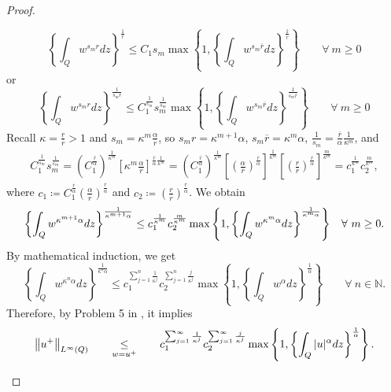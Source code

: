 \documentclass[11pt, a4paper]{article}
\numberwithin{equation}{section}
\newcommand{\coex}[2][\hphantom{longexplanation}]{%
  \underset{{#1}}{\overset{\hphantom{longexplanation}}{#2}}
}
\newcommand{\hk}{\hspace*{.12in}}
\newcommand{\NN}{{\mathbb N}}
\newcommand{\norm}[1]{\left\lVert #1\right\rVert}
\begin{document}
\begin{proof}
\begin{description}[wide]
 \[\left\{\int_{Q} w^{s_{m}r}  dz\right\}^{\frac{1}{r}}\le  
 C_{1}s_{m}\max\left\{1,\left\{\int_{Q}w^{s_{m}\overline{r}}  dz\right\}^{\frac{1}{\overline{r}}}\right\}  \qquad\forall~m\ge 0
\]
or
\[\left\{\int_{Q} w^{s_{m}r} dz\right\}^{\frac{1}{s_{m}r}}\le
 C_{1}^{\frac{1}{s_{m}}}s_{m}^{\frac{1}{s_{m}}}\max\left\{1,\left\{\int_{Q}w^{s_{m}\overline{r}}  dz\right\}^{\frac{1}{s_{m}\overline{r}}}\right\}  \qquad\forall~m\ge 0
 \]
Recall $\kappa=\frac{r}{\overline{r}}>1$ and $s_{m}=
\kappa^{m}\frac{\alpha}{\overline{r}}$, so $s_{m}r=
\kappa^{m+1}\alpha$, $s_{m}\overline{r}= \kappa^{m}\alpha$,
$\frac{1}{s_{m}}=\frac{\overline{r}}{\alpha}\frac{1}{\kappa^{m}} $, and %
\begin{align*}
C_{1}^{\frac{1}{s_{m}}} s_{m}^{\frac{1}{s_{m}}}= \left(
  C_{1}^{\frac{\overline{r}}{\alpha}} \right)^{\frac{1}{\kappa^{m}}} \left[ \kappa^{m}\frac{\alpha}{\overline{r}}
\right]^{\frac{\overline{r}}{\alpha}\frac{1}{\kappa^{m}}}
= \left( C_{1}^{\frac{\overline{r}}{\alpha}}
  \right)^{\frac{1}{\kappa^{m}}} \left[\left(\frac{\alpha}{\overline{r}}
  \right)^{\frac{\overline{r}}{\alpha}} \right]^{\frac{1}{\kappa^{m}}}
\left[ \left(\frac{r}{\overline{r}}
  \right)^{\frac{\overline{r}}{\alpha}}
  \right]^{\frac{m}{\kappa^{m}}}
  = c_{1}^{\frac{1}{\kappa^{m}}}c_{2}^{\frac{m}{\kappa^{m}}},
\end{align*}
where $c_{1}\coloneqq
C_{1}^{\frac{\overline{r}}{\alpha}} \left(\frac{\alpha}{\overline{r}} \right)^{\frac{\overline{r}}{\alpha}}$
and $c_{2}\coloneqq\left(\frac{r}{\overline{r}} \right)^{\frac{\overline{r}}{\alpha}}$.
We obtain
\begin{equation}
  \left\{\int_{Q}  w^{\kappa^{m+1}\alpha} dz\right\}^{\frac{1}{\kappa^{m+1}\alpha} }  \le  
  c_{1}^{\frac{1}{\kappa^{m}}}c_{2}^{\frac{m}{\kappa^{m}}}\max\left\{1,\left\{\int_{Q} w^{\kappa^{m}\alpha}  dz\right\}^{\frac{1}{\kappa^{m}\alpha}}\right\}\hk\forall~m\ge 0.
 \label{le465b}
\end{equation}
 By mathematical induction, we get
 \[
   \left\{\int_{Q}w^{\kappa^{n}\alpha}dz\right\}^{\frac{1}{\kappa^{n}\alpha}}
   \le
c_{1}^{\sum_{j=1}^{n}\frac{1}{\kappa^{j}}}c_{2}^{\sum_{j=1}^{n}\frac{j}{\kappa^{j}}}\max\left\{1,\left\{\int_{Q}w^{\alpha}
     dz\right\}^{\frac{1}{\alpha}}\right\}\qquad\forall~n\in\NN.
\]
    Therefore,  by Problem 5 in \cite[p.71]{rudinRealComplexAnalysis1987}, it implies 
    \[
      \norm{u^{+}}_{L^{\infty}(Q)}
      \coex[w = u^+]{\le}      c_{1}^{\sum_{j=1}^{\infty}\frac{1}{\kappa^{j}}}c_{2}^{\sum_{j=1}^{\infty}\frac{j}{\kappa^{j}}}\max\left\{1,\left\{\int_{Q}|u|^{\alpha}
          dz\right\}^{\frac{1}{\alpha}}\right\}.
    \]
    

\end{description}
\end{proof}
\end{document}
